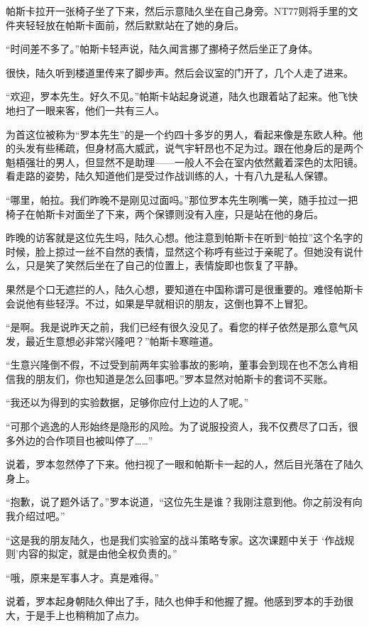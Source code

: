 帕斯卡拉开一张椅子坐了下来，然后示意陆久坐在自己身旁。NT77则将手里的文件夹轻轻放在帕斯卡面前，然后默默站在了她的身后。

“时间差不多了。”帕斯卡轻声说，陆久闻言挪了挪椅子然后坐正了身体。

很快，陆久听到楼道里传来了脚步声。然后会议室的门开了，几个人走了进来。

 “欢迎，罗本先生。好久不见。”帕斯卡站起身说道，陆久也跟着站了起来。他飞快地扫了一眼来客，他们一共有三人。

为首这位被称为“罗本先生”的是一个约四十多岁的男人，看起来像是东欧人种。他的头发有些稀疏，但身材高大威武，说气宇轩昂也不足为过。跟在他身后的是两个魁梧强壮的男人，但显然不是助理——一般人不会在室内依然戴着深色的太阳镜。看走路的姿势，陆久知道他们是受过作战训练的人，十有八九是私人保镖。

“哪里，帕拉。我们昨晚不是刚见过面吗。”那位罗本先生咧嘴一笑，随手拉过一把椅子在帕斯卡对面坐了下来，两个保镖则没有入座，只是站在他的身后。

昨晚的访客就是这位先生吗，陆久心想。他注意到帕斯卡在听到“帕拉”这个名字的时候，脸上掠过一丝不自然的表情，显然这个称呼有些过于亲昵了。但她没有说什么，只是笑了笑然后坐在了自己的位置上，表情旋即也恢复了平静。

果然是个口无遮拦的人，陆久心想，要知道在中国称谓可是很重要的。难怪帕斯卡会说他有些轻浮。不过，如果是早就相识的朋友，这倒也算不上冒犯。

“是啊。我是说昨天之前，我们已经有很久没见了。看您的样子依然是那么意气风发，最近生意想必非常兴隆吧？”帕斯卡寒暄道。

“生意兴隆倒不假，不过受到前两年实验事故的影响，董事会到现在也不怎么肯相信我的朋友们，你也知道是怎么回事吧。”罗本显然对帕斯卡的套词不买账。

“我还以为得到的实验数据，足够你应付上边的人了呢。”

“可那个逃逸的人形始终是隐形的风险。为了说服投资人，我不仅费尽了口舌，很多外边的合作项目也被叫停了……”

说着，罗本忽然停了下来。他扫视了一眼和帕斯卡一起的人，然后目光落在了陆久身上。

“抱歉，说了题外话了。”罗本说道，“这位先生是谁？我刚注意到他。你之前没有向我介绍过吧。”

“这是我的朋友陆久，也是我们实验室的战斗策略专家。这次课题中关于 ‘作战规则’内容的拟定，就是由他全权负责的。”

“哦，原来是军事人才。真是难得。”

说着，罗本起身朝陆久伸出了手，陆久也伸手和他握了握。他感到罗本的手劲很大，于是手上也稍稍加了点力。

